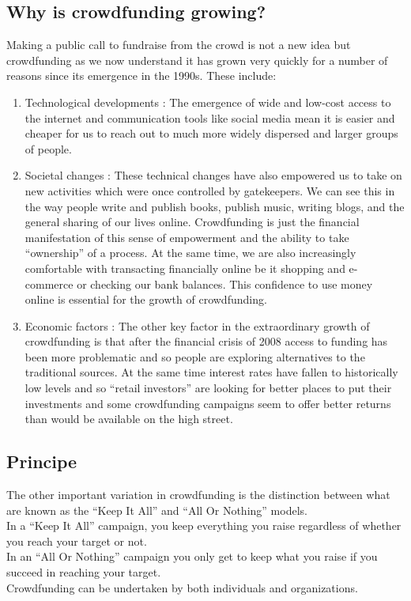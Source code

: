 \subsection*{ Why is crowdfunding growing? }
Making a public call to fundraise from the crowd is not a new idea but crowdfunding as we now understand it has grown very quickly for a number of reasons since its emergence in the 1990s. These include:
\begin{enumerate}
      \item
            Technological developments : The emergence of wide and low-cost access to the internet and communication tools like social media mean it is easier and cheaper for us to reach out to much more widely dispersed and larger groups of people.
      \item
            Societal changes : These technical changes have also empowered us to take on new activities which were once controlled by gatekeepers. We can see this in the way people write and publish books, publish music, writing blogs, and the general sharing of our lives online. Crowdfunding is just the financial manifestation of this sense of empowerment and the ability to take “ownership” of a process. At the same time, we are also increasingly comfortable with transacting financially online be it shopping and e-commerce or checking our bank balances. This confidence to use money online is essential for the growth of crowdfunding.
      \item
            Economic factors : The other key factor in the extraordinary growth of crowdfunding is that after the financial crisis of 2008 access to funding has been more problematic and so people are exploring alternatives to the traditional sources. At the same time interest rates have fallen to historically low levels and so “retail investors” are looking for better places to put their investments and some crowdfunding campaigns seem to offer better returns than would be available on the high street.
\end{enumerate}

\subsection*{Principe }
The other important variation in crowdfunding is the distinction between what are known as the “Keep It All” and “All Or Nothing” models.\\
In a “Keep It All” campaign, you keep everything you raise regardless of whether you reach your target or not.\\
In an “All Or Nothing” campaign you only get to keep what you raise if you succeed in reaching your target.\\
Crowdfunding can be undertaken by both individuals and organizations.


